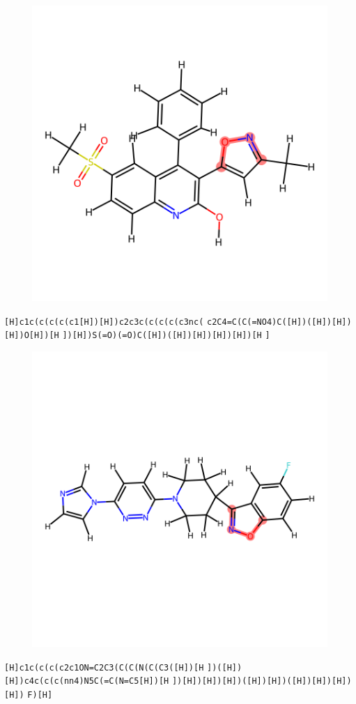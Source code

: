 \documentclass{article}
\begin{document}
\begin{figure}[ht]
\centering
    \includegraphics{mol212.png}
\end{figure}
\verb|[H]c1c(c(c(c(c1[H])[H])c2c3c(c(c(c(c3nc(| \verb|c2C4=C(C(=NO4)C([H])([H])[H])[H])O[H])[H| \verb|])[H])S(=O)(=O)C([H])([H])[H])[H])[H])[H| \verb|]|

\begin{figure}[ht]
\centering
    \includegraphics{mol213.png}
\end{figure}
\verb|[H]c1c(c(c(c2c1ON=C2C3(C(C(N(C(C3([H])[H| \verb|])([H])[H])c4c(c(c(nn4)N5C(=C(N=C5[H])[H| \verb|])[H])[H])[H])([H])[H])([H])[H])[H])[H])| \verb|F)[H]|
\end{document}
